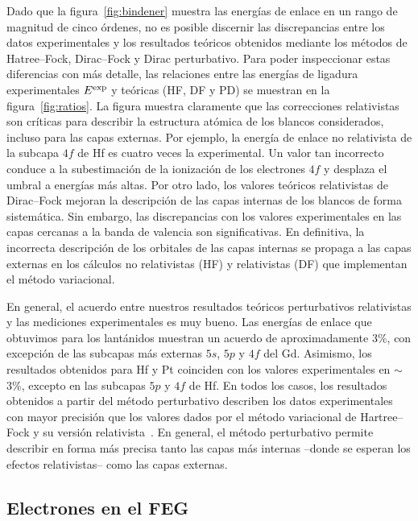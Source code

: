 Dado que la figura~\ref{fig:bindener} muestra las energías de enlace en 
un rango de magnitud de cinco órdenes, no es posible discernir las 
discrepancias entre los datos experimentales y los resultados teóricos
obtenidos mediante los métodos de Hatree--Fock, Dirac--Fock y Dirac 
perturbativo. Para poder inspeccionar estas diferencias con más detalle, 
las relaciones entre las energías de ligadura experimentales 
$E^{\mbox{\scriptsize exp}}$ y teóricas (HF, DF y PD) se muestran en la 
figura~\ref{fig:ratios}. La figura muestra claramente que las 
correcciones relativistas son críticas para describir la estructura 
atómica de los blancos considerados, incluso para las capas externas. 
Por ejemplo, la energía de enlace no relativista de la subcapa $4f$ de 
Hf es cuatro veces la experimental. Un valor tan incorrecto conduce a la 
subestimación de la ionización de los electrones $4f$ y desplaza el 
umbral a energías más altas. Por otro lado, los valores teóricos 
relativistas de Dirac--Fock mejoran la descripción de las capas internas 
de los blancos de forma sistemática. Sin embargo, las discrepancias con 
los valores experimentales en las capas cercanas a la banda de valencia 
son significativas. En definitiva, la incorrecta descripción de los 
orbitales de las capas internas se propaga a las capas externas en los 
cálculos no relativistas (HF) y relativistas (DF) que implementan el 
método variacional. 

En general, el acuerdo entre nuestros resultados teóricos perturbativos 
relativistas y las mediciones experimentales es muy bueno. 
Las energías de enlace que obtuvimos para los lantánidos muestran un 
acuerdo de aproximadamente 3\%, con excepción de las subcapas más 
externas $5s$, $5p$ y $4f$ del Gd. Asimismo, los resultados 
obtenidos para Hf y Pt coinciden con los valores experimentales en 
$\sim$3\%, excepto en las subcapas $5p$ y $4f$ de Hf. En todos los 
casos, los resultados obtenidos a partir del método perturbativo 
describen los datos experimentales con mayor precisión que los valores 
dados por el método variacional de Hartree--Fock y su versión 
relativista~\cite{Desclaux:73}. En general, el método perturbativo 
permite describir en forma más precisa tanto las capas más internas 
--donde se esperan los efectos relativistas-- como las capas externas.

\subsection{Electrones en el FEG}

